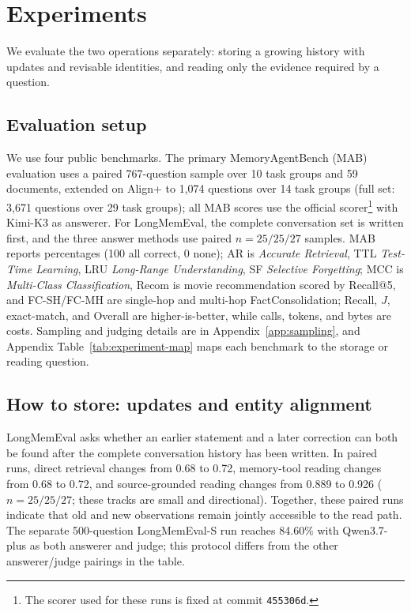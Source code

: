 \section{Experiments}
\label{sec:experiments}

We evaluate the two operations separately: storing a growing history with updates and revisable identities, and reading only the evidence required by a question.

\subsection{Evaluation setup}
\label{sec:setup}

We use four public benchmarks. The primary MemoryAgentBench (MAB) evaluation uses a paired 767-question sample over 10 task groups and 59 documents, extended on Align+ to 1{,}074 questions over 14 task groups (full set: 3{,}671 questions over 29 task groups); all MAB scores use the official scorer\footnote{The scorer used for these runs is fixed at commit \texttt{455306d}.} with Kimi-K3 as answerer. For LongMemEval, the complete conversation set is written first, and the three answer methods use paired $n{=}25/25/27$ samples. MAB reports percentages (100 all correct, 0 none); AR is \emph{Accurate Retrieval}, TTL \emph{Test-Time Learning}, LRU \emph{Long-Range Understanding}, SF \emph{Selective Forgetting}; MCC is \emph{Multi-Class Classification}, Recom is movie recommendation scored by Recall@5, and FC-SH/FC-MH are single-hop and multi-hop FactConsolidation; Recall, $J$, exact-match, and Overall are higher-is-better, while calls, tokens, and bytes are costs. Sampling and judging details are in Appendix~\ref{app:sampling}, and Appendix Table~\ref{tab:experiment-map} maps each benchmark to the storage or reading question.



\subsection{How to store: updates and entity alignment}
\label{sec:temporal-benchmark}
\label{sec:engine-versions}
\label{sec:engine-paired}
\label{sec:deletion-boundary}

LongMemEval asks whether an earlier statement and a later correction can both be found after the complete conversation history has been written. In paired runs, direct retrieval changes from 0.68 to 0.72, memory-tool reading changes from 0.68 to 0.72, and source-grounded reading changes from 0.889 to 0.926 ($n{=}25/25/27$; these tracks are small and directional). Together, these paired runs indicate that old and new observations remain jointly accessible to the read path. The separate 500-question LongMemEval-S run reaches 84.60\% with Qwen3.7-plus as both answerer and judge; this protocol differs from the other answerer/judge pairings in the table.

